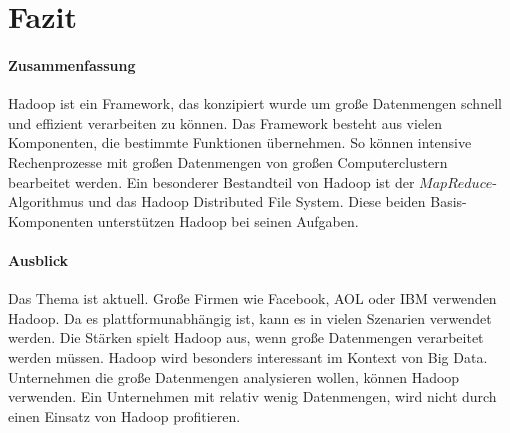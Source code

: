 \section{Fazit}
\paragraph{Zusammenfassung}$\;$ \\
Hadoop ist ein Framework, das konzipiert wurde um große Datenmengen schnell und effizient verarbeiten zu können. Das Framework besteht aus vielen Komponenten, die bestimmte Funktionen übernehmen. So können intensive Rechenprozesse mit großen Datenmengen von großen Computerclustern bearbeitet werden. Ein besonderer Bestandteil von Hadoop ist der $MapReduce$-Algorithmus und das Hadoop Distributed File System. Diese beiden Basis-Komponenten unterstützen Hadoop bei seinen Aufgaben.
\paragraph{Ausblick}$\;$ \\
Das Thema ist aktuell. Große Firmen wie Facebook, AOL oder IBM verwenden Hadoop. Da es plattformunabhängig ist, kann es in vielen Szenarien verwendet werden. Die Stärken spielt Hadoop aus, wenn große Datenmengen verarbeitet werden müssen. Hadoop wird besonders interessant im Kontext von Big Data. Unternehmen die große Datenmengen analysieren wollen, können Hadoop verwenden. Ein Unternehmen mit relativ wenig Datenmengen, wird nicht durch einen Einsatz von Hadoop profitieren.